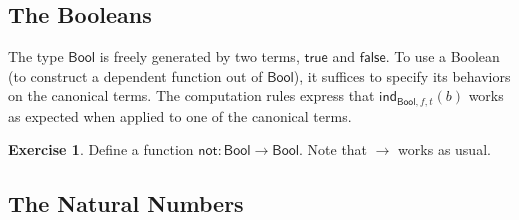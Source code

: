 \documentclass{amsart}
\theoremstyle{definition}
\newtheorem{ex}{Exercise}[section]
\newcommand{\type}{\ensuremath{\mathsf{~type}}}
\newcommand{\defeq}{\ensuremath{\overset{\boldsymbol{\cdot}}{=}}}
\newcommand{\Bool}{\ensuremath{\mathsf{Bool}}}
\newcommand{\True}{\ensuremath{\mathsf{true}}}
\newcommand{\False}{\ensuremath{\mathsf{false}}}
\newcommand{\Ind}{\ensuremath{\mathsf{ind}}}
\begin{document}
\subsection{The Booleans}
\label{sec:the-booleans}

The type $\Bool$ is freely generated by two terms, $\True$ and $\False$.
To use a Boolean (to construct a dependent function out of $\Bool$), it suffices to specify its behaviors on the canonical terms.
The computation rules express that $\Ind_{\Bool,f,t}(b)$ works as expected when applied to one of the canonical terms.


\begin{ex}\label{ex:not}
    Define a function $\mathsf{not}: \Bool \to \Bool$.
    Note that $\to$ works as usual.
\end{ex}

\subsection{The Natural Numbers}
\label{sec:the-natural-numbers}
\end{document}
